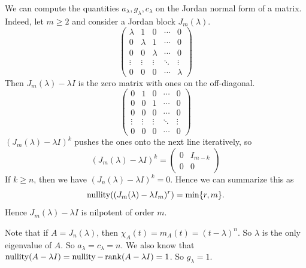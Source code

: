 \documentclass[a4paper]{article}
\begin{document}
We can compute the quantities \( a_\lambda, g_\lambda, c_\lambda \) on the Jordan normal form of a matrix.
Indeed, let \( m \geq 2 \) and consider a Jordan block \( J_m(\lambda) \).
\[
	\begin{pmatrix}
		\lambda & 1       & 0       & \cdots & 0       \\
		0       & \lambda & 1       & \cdots & 0       \\
		0       & 0       & \lambda & \cdots & 0       \\
		\vdots  & \vdots  & \vdots  & \ddots & \vdots  \\
		0       & 0       & 0       & \cdots & \lambda
	\end{pmatrix}
\]
Then \( J_m(\lambda) - \lambda I \) is the zero matrix with ones on the off-diagonal.
\[
	\begin{pmatrix}
		0 & 1       & 0       & \cdots & 0       \\
		0       & 0 & 1       & \cdots & 0       \\
		0       & 0       & 0 & \cdots & 0       \\
		\vdots  & \vdots  & \vdots  & \ddots & \vdots  \\
		0       & 0       & 0       & \cdots & 0
	\end{pmatrix}
\]
\( (J_m(\lambda) - \lambda I)^k \) pushes the ones onto the next line iteratively, so
\[
	(J_m(\lambda) - \lambda I)^k = \begin{pmatrix}
		0 & I_{m-k} \\
		0 & 0
	\end{pmatrix}
\]
If $k \geq n$, then we have $(J_n(\lambda) - \lambda I)^k = 0$.
Hence we can summarize this as
\[
\operatorname{nullity}((J_m(\lambda) - \lambda I_m)^r) = \min\{r, m\}.
\]
Hence \( J_m(\lambda) - \lambda I \) is nilpotent of order \( m \).

Note that if $A = J_n(\lambda)$, then $\chi_A(t) = m_A(t) = (t - \lambda)^n$. So $\lambda$ is the only eigenvalue of $A$. So $a_\lambda = c_\lambda = n$. We also know that $\operatorname{nullity}(A - \lambda I) = \operatorname{nullity} - \rank(A - \lambda I) = 1$. So $g_\lambda = 1$.
\end{document}
